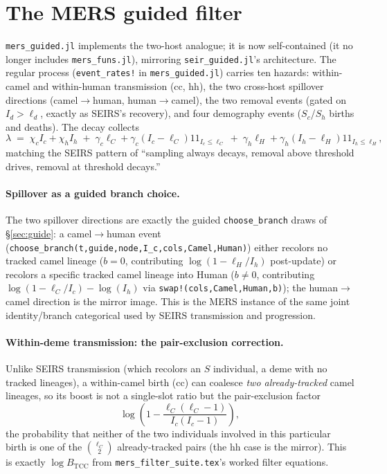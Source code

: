 \documentclass[11pt]{article}
\newcommand{\ind}{1\!\!1}
\theoremstyle{plain}
\begin{document}
\section{The MERS guided filter}
\label{sec:mers}

\texttt{mers\_guided.jl} implements the two-host analogue; it is now self-contained (it no longer
includes \texttt{mers\_funs.jl}), mirroring \texttt{seir\_guided.jl}'s architecture. The regular
process (\texttt{event\_rates!} in \texttt{mers\_guided.jl}) carries ten hazards: within-camel and
within-human transmission (cc, hh), the two cross-host spillover directions (camel$\to$human,
human$\to$camel), the two removal events (gated on $I_d>\ell_d$, exactly as SEIRS's recovery),
and four demography events ($S_c$/$S_h$ births and deaths). The decay collects
\[
\lambda \;=\; \chi_c I_c + \chi_h I_h \;+\; \gamma_c \ell_C + \gamma_c(I_c-\ell_C)\ind_{I_c\le \ell_C}
\;+\; \gamma_h \ell_H + \gamma_h(I_h-\ell_H)\ind_{I_h\le \ell_H},
\]
matching the SEIRS pattern of ``sampling always decays, removal above threshold drives, removal at
threshold decays.''

\paragraph{Spillover as a guided branch choice.} The two spillover directions are exactly the
guided \texttt{choose\_branch} draws of \S\ref{sec:guide}: a camel$\to$human event
(\texttt{choose\_branch(t,guide,node,I\_c,cols,Camel,Human)}) either recolors no tracked camel
lineage ($b=0$, contributing $\log(1-\ell_H/I_h)$ post-update) or recolors a specific tracked camel
lineage into Human ($b\neq0$, contributing $\log(1-\ell_C/I_c)-\log(I_h)$ via
\texttt{swap!(cols,Camel,Human,b)}); the human$\to$camel direction is the mirror image. This is the
MERS instance of the same joint identity/branch categorical used by SEIRS transmission and
progression.

\paragraph{Within-deme transmission: the pair-exclusion correction.} Unlike SEIRS transmission
(which recolors an $S$ individual, a deme with no tracked lineages), a within-camel birth (cc) can
coalesce \emph{two already-tracked} camel lineages, so its boost is not a single-slot ratio but the
pair-exclusion factor
\[
\log\!\left(1 - \frac{\ell_C(\ell_C-1)}{I_c(I_c-1)}\right),
\]
the probability that neither of the two individuals involved in this particular birth is one of
the $\binom{\ell_C}{2}$ already-tracked pairs (the hh case is the mirror). This is exactly
$\log B_{\mathrm{TCC}}$ from \texttt{mers\_filter\_suite.tex}'s worked filter equations.
\end{document}
